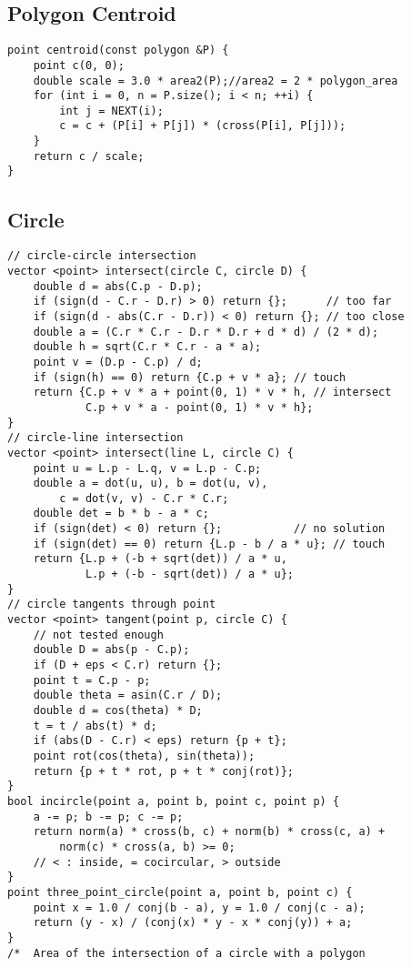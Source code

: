 \documentclass[landscape, 8pt, a4paper, oneside]{extarticle}
\begin{document}
\begin{multicols}{3}
\subsection{Polygon Centroid}
\begin{verbatim}
point centroid(const polygon &P) {
    point c(0, 0);
    double scale = 3.0 * area2(P);//area2 = 2 * polygon_area
    for (int i = 0, n = P.size(); i < n; ++i) {
        int j = NEXT(i);
        c = c + (P[i] + P[j]) * (cross(P[i], P[j]));
    }
    return c / scale;
}
\end{verbatim}
\subsection{Circle}
\begin{verbatim}
// circle-circle intersection
vector <point> intersect(circle C, circle D) {
    double d = abs(C.p - D.p);
    if (sign(d - C.r - D.r) > 0) return {};      // too far
    if (sign(d - abs(C.r - D.r)) < 0) return {}; // too close
    double a = (C.r * C.r - D.r * D.r + d * d) / (2 * d);
    double h = sqrt(C.r * C.r - a * a);
    point v = (D.p - C.p) / d;
    if (sign(h) == 0) return {C.p + v * a}; // touch
    return {C.p + v * a + point(0, 1) * v * h, // intersect
            C.p + v * a - point(0, 1) * v * h};
}
// circle-line intersection
vector <point> intersect(line L, circle C) {
    point u = L.p - L.q, v = L.p - C.p;
    double a = dot(u, u), b = dot(u, v),
        c = dot(v, v) - C.r * C.r;
    double det = b * b - a * c;
    if (sign(det) < 0) return {};           // no solution
    if (sign(det) == 0) return {L.p - b / a * u}; // touch
    return {L.p + (-b + sqrt(det)) / a * u,
            L.p + (-b - sqrt(det)) / a * u};
}
// circle tangents through point
vector <point> tangent(point p, circle C) {
    // not tested enough
    double D = abs(p - C.p);
    if (D + eps < C.r) return {};
    point t = C.p - p;
    double theta = asin(C.r / D);
    double d = cos(theta) * D;
    t = t / abs(t) * d;
    if (abs(D - C.r) < eps) return {p + t};
    point rot(cos(theta), sin(theta));
    return {p + t * rot, p + t * conj(rot)};
}
bool incircle(point a, point b, point c, point p) {
    a -= p; b -= p; c -= p;
    return norm(a) * cross(b, c) + norm(b) * cross(c, a) +
        norm(c) * cross(a, b) >= 0;
    // < : inside, = cocircular, > outside
}
point three_point_circle(point a, point b, point c) {
    point x = 1.0 / conj(b - a), y = 1.0 / conj(c - a);
    return (y - x) / (conj(x) * y - x * conj(y)) + a;
}
/*  Area of the intersection of a circle with a polygon

\end{verbatim}
\end{multicols}
\end{document}
